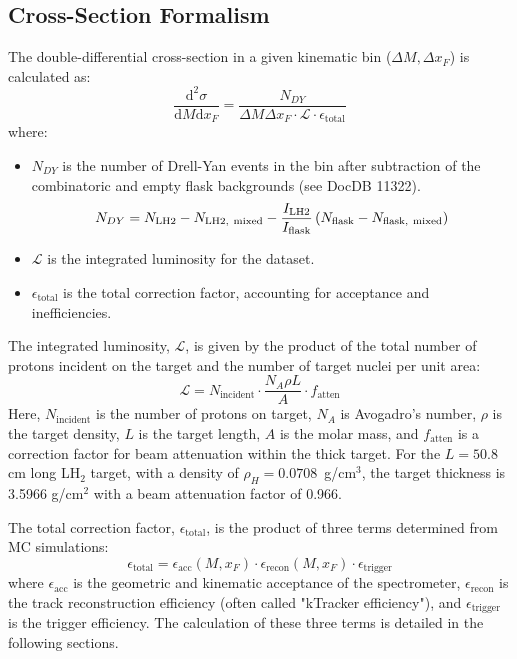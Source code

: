 \documentclass[11pt]{article}
\newcommand{\diffd}{\mathrm{d}}
\begin{document}
\subsection{Cross-Section Formalism}
The double-differential cross-section in a given kinematic bin ($\Delta M, \Delta x_F$) is calculated as:
\begin{equation}
\frac{\diffd^{2}\sigma}{\diffd M \diffd x_{F}} = \frac{N_{DY}}{\Delta M \Delta x_{F} \cdot \mathcal{L} \cdot \epsilon_{\text{total}}}
\label{eq:modified_cross_section}
\end{equation}
where:
\begin{itemize}
    \item $N_{DY}$ is the number of Drell-Yan events in the bin after subtraction of the combinatoric and empty flask backgrounds (see \cite{alternativeDY} DocDB 11322).
    $$N_{DY} = N_{\rm LH2}-N_{\rm LH2,~mixed} - \frac{I_{\rm LH2}}{I_{\rm flask}}\left( N_{\rm flask}-N_{\rm flask,~mixed}\right)$$
    \item $\mathcal{L}$ is the integrated luminosity for the dataset.
    \item $\epsilon_{\text{total}}$ is the total correction factor, accounting for acceptance and inefficiencies.
\end{itemize}
The integrated luminosity, $\mathcal{L}$, is given by the product of the total number of protons incident on the target and the number of target nuclei per unit area:
\begin{equation}
\mathcal{L} = N_{\text{incident}} \cdot \frac{N_{A} \rho L}{A} \cdot f_{\text{atten}}
\label{eq:luminosity}
\end{equation}
Here, $N_{\text{incident}}$ is the number of protons on target, $N_A$ is Avogadro's number, $\rho$ is the target density, $L$ is the target length, $A$ is the molar mass, and $f_{\text{atten}}$ is a correction factor for beam attenuation within the thick target. For the $L=50.8$ cm long LH$_2$ target, with a density of $\rho_H=0.0708$~g/cm$^3$, the target thickness is 3.5966 g/cm$^2$ with a beam attenuation factor of 0.966.

The total correction factor, $\epsilon_{\text{total}}$, is the product of three terms determined from MC simulations:
\begin{equation}
\epsilon_{\text{total}} = \epsilon_{\text{acc}}(M,x_{F}) \cdot \epsilon_{\text{recon}}(M,x_{F}) \cdot \epsilon_{\text{trigger}}
\end{equation}
where $\epsilon_{\text{acc}}$ is the geometric and kinematic acceptance of the spectrometer, $\epsilon_{\text{recon}}$ is the track reconstruction efficiency (often called "kTracker efficiency"), and $\epsilon_{\text{trigger}}$ is the trigger efficiency. The calculation of these three terms is detailed in the following sections.
\end{document}
